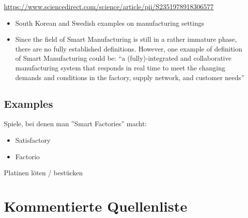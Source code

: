 \documentclass[11pt,titlepage]{article}
\begin{document}
  \url{https://www.sciencedirect.com/science/article/pii/S2351978918306577}
  \begin{itemize}
    \item South Korean and Swedish examples on manufacturing settings
    \item Since the field of Smart Manufacturing is still in a rather immature phase, there are no fully established
    definitions. However, one example of definition of Smart Manufacturing could be: “a (fully)-integrated and
    collaborative manufacturing system that responds in real time to meet the changing demands and conditions in the
    factory, supply network, and customer needs”
  \end{itemize}


  \subsection{Examples}
  \label{sec:Brainstorm_Examples}

  Spiele, bei denen man ''Smart Factories'' macht:
  \begin{itemize}
    \item Satisfactory 
    \item Factorio
  \end{itemize}


Platinen löten / bestücken

\section{Kommentierte Quellenliste}
\label{sec:KommentierteQuellenliste}
  
\end{document}
